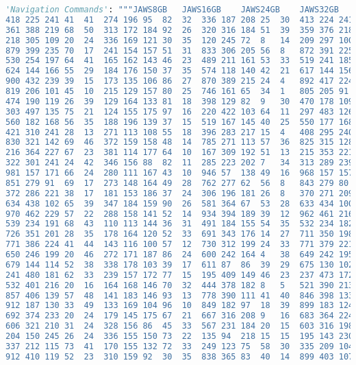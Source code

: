 \begin{lstlisting}[language=Python]
    'Navigation Commands': """JAWS8GB	JAWS16GB	JAWS24GB	JAWS32GB	JAWS64GB	NVDA8GB	NVDA16GB	NVDA24GB	NVDA32GB	NVDA64GB	SUPERNOVA8GB	SUPERNOVA16GB	SUPERNOVA24GB	SUPERNOVA32GB	SUPERNOVA64GB	NARRATOR8GB	NARRATOR16GB	NARRATOR24GB	NARRATOR32GB	NARRATOR64GB
418	225	241	41	41	274	196	95	82	32	336	187	208	25	30	413	224	241	27	29
361	388	219	68	50	313	172	184	92	26	320	316	184	51	39	359	376	218	68	39
218	305	109	20	24	336	169	121	30	35	120	245	72	8	14	209	297	100	17	24
879	399	235	70	17	241	154	157	51	31	833	306	205	56	8	872	391	225	57	13
530	254	197	64	41	165	162	143	46	23	489	211	161	53	33	519	241	185	52	31
624	144	166	55	29	184	176	150	37	35	574	118	140	42	21	617	144	156	55	21
900	432	239	39	15	173	135	106	86	27	870	389	215	24	4	892	417	224	36	10
819	206	101	45	10	215	129	157	80	25	746	161	65	34	1	805	205	91	44	1
474	190	119	26	39	129	164	133	81	18	398	129	82	9	30	470	178	109	14	32
303	497	135	75	21	124	155	175	97	16	220	422	103	64	11	297	483	126	74	13
560	182	168	56	35	188	196	139	37	15	519	167	145	40	25	550	177	168	46	20
421	310	241	28	13	271	113	108	55	18	396	283	217	15	4	408	295	240	20	7
830	321	142	69	46	372	159	158	48	14	785	271	113	57	36	825	315	128	58	43
216	364	227	67	23	381	114	177	64	10	167	309	192	51	13	215	353	221	67	14
322	301	241	24	42	346	156	88	82	11	285	223	202	7	34	313	289	239	12	38
981	157	171	66	24	280	111	167	43	10	946	57	138	49	16	968	157	157	61	9
851	279	91	69	17	273	148	164	49	28	762	277	62	56	8	843	279	80	68	12
372	286	221	38	17	181	153	186	37	24	306	196	181	26	8	370	271	209	35	7
634	438	102	65	39	347	184	159	90	26	581	364	67	53	28	633	434	100	53	34
970	462	229	57	22	288	158	141	52	14	934	394	189	39	12	962	461	216	51	15
539	234	191	68	43	110	113	144	36	31	491	184	155	54	35	532	234	182	54	42
726	351	201	28	35	178	164	120	52	33	691	343	176	14	27	711	350	198	20	35
771	386	224	41	44	143	116	100	57	12	730	312	199	24	33	771	379	221	27	41
650	246	199	20	46	272	171	187	86	24	600	242	164	4	38	649	242	195	19	33
679	144	114	52	38	338	178	103	39	17	611	87	86	39	29	675	130	102	37	38
241	480	181	62	33	239	157	172	77	15	195	409	149	46	23	237	473	172	62	24
532	401	216	20	16	164	168	146	70	32	444	378	182	8	5	521	390	213	10	8
857	406	139	57	48	141	183	146	93	13	778	390	111	41	40	846	398	133	50	34
912	187	130	33	49	133	169	104	96	10	849	182	97	18	39	899	183	124	30	35
692	374	233	20	24	179	145	175	67	21	667	316	208	9	16	683	364	224	6	12
606	321	210	31	24	328	156	86	45	33	567	231	184	20	15	603	316	198	30	22
204	150	245	26	24	336	155	150	73	22	135	94	218	15	15	195	143	230	25	15
337	212	115	73	41	170	155	132	72	33	249	123	75	58	30	335	209	104	65	40
912	410	119	52	23	310	159	92	30	35	838	365	83	40	14	899	403	107	40	16

\end{lstlisting}
